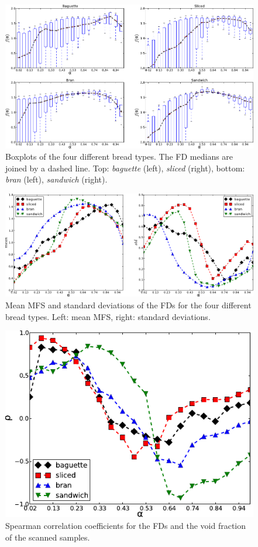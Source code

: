 \documentclass[spanish,a4paper,openright,11pt]{book}
\begin{document}
\begin{figure}[h!]
\centering
\includegraphics{boxplots}
\caption{Boxplots of the four different bread types. The FD medians are joined by a dashed line. Top: {\em baguette} (left), {\em sliced} (right), bottom: {\em bran} (left), {\em sandwich} (right).}
\label{fig:boxplotsMFS}
\end{figure}

\begin{figure}[h!]
\centering
\includegraphics{panstd}
\caption{Mean MFS and standard deviations of the FDs for the four different bread types. Left: mean MFS, right: standard deviations.}
\label{fig:meansMFS}
\end{figure}


\begin{figure}[h!]
\centering
\includegraphics{VF}
\caption{Spearman correlation coefficients for the FDs and the void fraction of the scanned samples.}
\label{fig:corrVF}
\end{figure}
\end{document}
